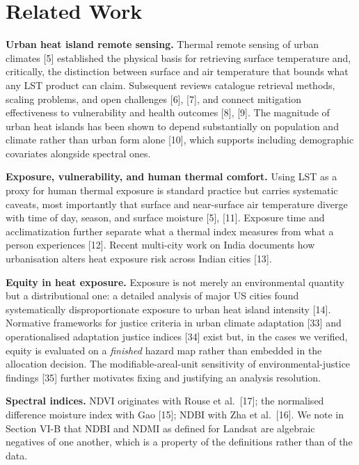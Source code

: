 \documentclass[conference]{IEEEtran}
\begin{document}
\section{Related Work}\label{ii.-related-work}

\textbf{Urban heat island remote sensing.} Thermal remote sensing of urban climates {[}5{]} established the
physical basis for retrieving surface temperature and, critically, the distinction between surface and
air temperature that bounds what any LST product can claim. Subsequent reviews catalogue retrieval
methods, scaling problems, and open challenges {[}6{]}, {[}7{]}, and connect mitigation effectiveness to
vulnerability and health outcomes {[}8{]}, {[}9{]}. The magnitude of urban heat islands has been shown to
depend substantially on population and climate rather than urban form alone {[}10{]}, which supports
including demographic covariates alongside spectral ones.

\textbf{Exposure, vulnerability, and human thermal comfort.} Using LST as a proxy for human thermal
exposure is standard practice but carries systematic caveats, most importantly that surface and
near-surface air temperature diverge with time of day, season, and surface moisture {[}5{]}, {[}11{]}.
Exposure time and acclimatization further separate what a thermal index measures from what a person
experiences {[}12{]}. Recent multi-city work on India documents how urbanisation alters heat exposure
risk across Indian cities {[}13{]}.

\textbf{Equity in heat exposure.} Exposure is not merely an environmental quantity but a distributional
one: a detailed analysis of major US cities found systematically disproportionate exposure to urban
heat island intensity {[}14{]}. Normative frameworks for justice criteria in urban climate adaptation
{[}33{]} and operationalised adaptation justice indices {[}34{]} exist but, in the cases we verified, equity
is evaluated on a \emph{finished} hazard map rather than embedded in the allocation decision. The
modifiable-areal-unit sensitivity of environmental-justice findings {[}35{]} further motivates fixing and
justifying an analysis resolution.

\textbf{Spectral indices.} NDVI originates with Rouse et al.~{[}17{]}; the normalised difference moisture index
with Gao {[}15{]}; NDBI with Zha et al.~{[}16{]}. We note in Section VI-B that NDBI and NDMI as defined for
Landsat are algebraic negatives of one another, which is a property of the definitions rather than of
the data.
\end{document}
